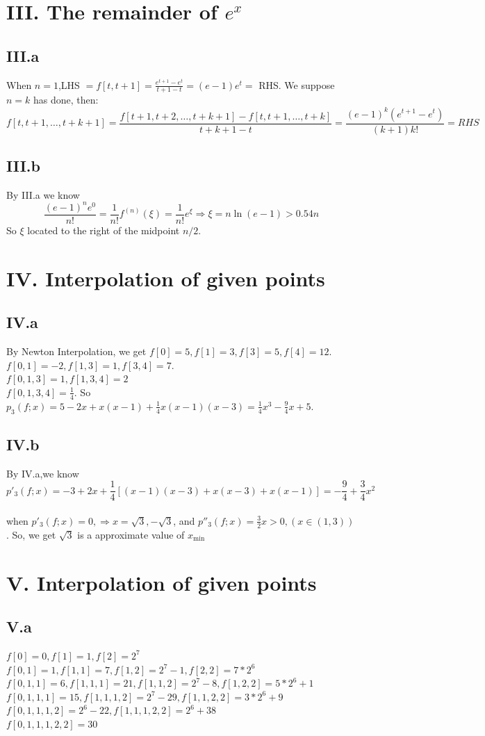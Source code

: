\documentclass[a4paper]{article}
\begin{document}
\section*{III. The remainder of $e^x$}
\subsection*{III.a}
When $n = 1$,LHS $= f[t,t+1] = \frac{e^{t+1}-e^t}{t+1-t} = (e - 1)e^t = $ RHS. We suppose $n = k$ has done, then:
\[
f[t,t+1,\ldots,t+k+1] = \frac{f[t+1,t+2,\ldots,t+k+1] - f[t,t+1,\ldots,t+k]}{t+k+1 - t} 
= \frac{(e-1)^k(e^{t+1}-e^t)}{(k+1)k!}= RHS
\]
\subsection*{III.b}
By III.a we know 
\[
\frac{(e-1)^n e^0}{n!} = \frac{1}{n!}f^{(n)}(\xi) = \frac{1}{n!}e^{\xi} \Rightarrow
\xi = n\ln(e-1) > 0.54n
\]
So $\xi$ located to the right of the midpoint $n/2$.
\section*{IV. Interpolation of given points}
\subsection*{IV.a}
By Newton Interpolation, we get $f[0] = 5,f[1] = 3,f[3] = 5,f[4]=12$.\\
$f[0,1] = -2,f[1,3] = 1,f[3,4] = 7$.\\
$f[0,1,3] = 1,f[1,3,4] = 2$\\
$f[0,1,3,4] = \frac{1}{4}$. So $p_3(f;x) = 5 - 2x + x(x-1) + \frac{1}{4}x(x-1)(x-3) = \frac{1}{4}x^3-\frac{9}{4}x+5$.
\subsection*{IV.b}
By IV.a,we know \[p'_3(f;x) = -3 + 2x + \frac{1}{4}[(x-1)(x-3) + x(x-3) + x(x-1)] =  -\frac{9}{4} + \frac{3}{4}x^2 \]\\
when $p'_3(f;x) = 0,\Rightarrow x = \sqrt{3} , -\sqrt{3}$, and $p''_3(f;x) = \frac{3}{2}x > 0,(x\in (1,3))$. So, we get
$\sqrt{3}$ is a approximate value of $x_{\min}$
\[
\]

\section*{V. Interpolation of given points}
\subsection*{V.a}
$ f[0] = 0,f[1] = 1,f[2] = 2^7$ \\
$ f[0,1] = 1,f[1,1] = 7,f[1,2] = 2^7 - 1,f[2,2] = 7*2^6 $\\
$ f[0,1,1] = 6,f[1,1,1] = 21,f[1,1,2] = 2^7 - 8,f[1,2,2] = 5*2^6 + 1$\\
$ f[0,1,1,1] = 15,f[1,1,1,2] = 2^7 - 29,f[1,1,2,2] = 3*2^6 + 9$ \\
$ f[0,1,1,1,2] = 2^6 - 22,f[1,1,1,2,2] = 2^6 + 38$\\
$ f[0,1,1,1,2,2] = 30$
\end{document}
